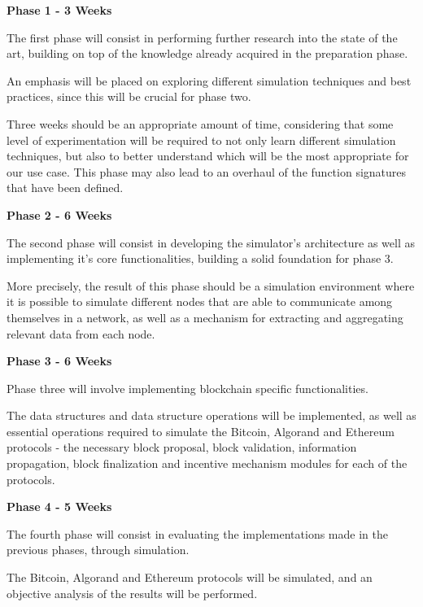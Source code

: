 \vspace{0.25cm}

\textbf{Phase 1 - 3 Weeks}

The first phase will consist in performing further research into the state of the art, building on top of the knowledge already acquired in the preparation phase.

An emphasis will be placed on exploring different simulation techniques and best practices, since this will be crucial for phase two.

Three weeks should be an appropriate amount of time, considering that some level of experimentation will be required to not only learn different simulation techniques, but also to better understand which will be the most appropriate for our use case. This phase may also lead to an overhaul of the function signatures that have been defined.

\vspace{0.25cm}

\textbf{Phase 2 - 6 Weeks}

The second phase will consist in developing the simulator's architecture as well as implementing it's core functionalities, building a solid foundation for phase 3.

More precisely, the result of this phase should be a simulation environment where it is possible to simulate different nodes that are able to communicate among themselves in a network, as well as a mechanism for extracting and aggregating relevant data from each node.

\vspace{0.25cm}

\textbf{Phase 3 - 6 Weeks}

Phase three will involve implementing blockchain specific functionalities. 

The data structures and data structure operations will be implemented, as well as essential operations required to simulate the Bitcoin, Algorand and Ethereum protocols - the necessary block proposal, block validation, information propagation, block finalization and incentive mechanism modules for each of the protocols.

\vspace{0.25cm}

\textbf{Phase 4 - 5 Weeks}

The fourth phase will consist in evaluating the implementations made in the previous phases, through simulation.

The Bitcoin, Algorand and Ethereum protocols will be simulated, and an objective analysis of the results will be performed.

